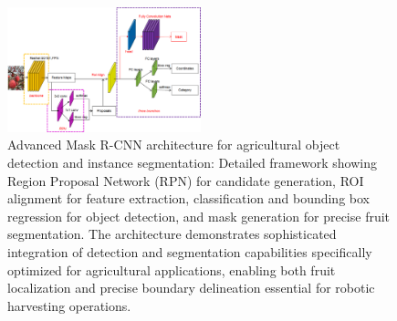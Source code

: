 \documentclass{ieeeaccess}
\begin{document}
\begin{figure}[hbtp]
\centering
\includegraphics[width=0.5\textwidth]{fig_maskRcnn.png}
\caption{Advanced Mask R-CNN architecture for agricultural object detection and instance segmentation: Detailed framework showing Region Proposal Network (RPN) for candidate generation, ROI alignment for feature extraction, classification and bounding box regression for object detection, and mask generation for precise fruit segmentation. The architecture demonstrates sophisticated integration of detection and segmentation capabilities specifically optimized for agricultural applications, enabling both fruit localization and precise boundary delineation essential for robotic harvesting operations.~\cite{he2017mask}}
\label{fig:mask_rcnn}
\end{figure}
\end{document}
